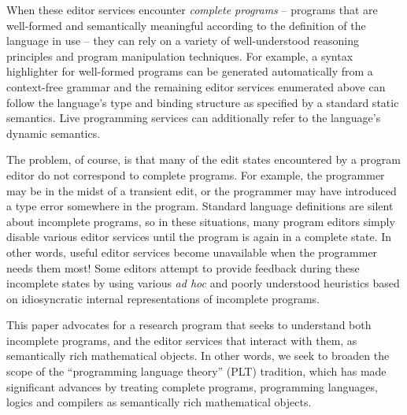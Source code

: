 \documentclass[letterpaper,USenglish]{lipics-v2016}
\begin{document}
When these editor services encounter \emph{complete programs} -- programs that are well-formed and semantically meaningful according to the definition of the language in use -- they can rely on a variety of well-understood reasoning principles and program manipulation techniques. For example, a syntax highlighter for well-formed programs can be generated automatically 
from a context-free grammar \cite{DBLP:conf/tools/KrahnRV08,DBLP:conf/cc/BrandDHJJKKMOSVVV01} and the remaining editor services enumerated above can follow the language's type and binding structure as specified by a standard static
semantics. Live programming services can additionally refer to the language's dynamic semantics.

The problem, of course, is that many of the {edit states} encountered by a program editor do not correspond to complete programs. For example, the programmer may be in the midst of a transient edit, or the programmer may have introduced a type error somewhere in the program. Standard language definitions are silent about incomplete programs, so in these situations, many program editors simply disable various editor services until the program is again in a complete state. In other words, useful editor services become unavailable when the programmer needs them most!
Some editors attempt to provide feedback during these incomplete states by using various \emph{ad hoc} and poorly understood heuristics based on idiosyncratic internal representations of  incomplete programs.

This paper advocates for a research program that seeks to understand both incomplete programs, and the editor services that interact with them, as semantically rich mathematical objects. In other words, we seek to broaden the scope of the ``programming language theory'' (PLT) tradition, which has made significant advances by treating complete programs, programming languages, logics and compilers as semantically rich mathematical objects. %
\end{document}
